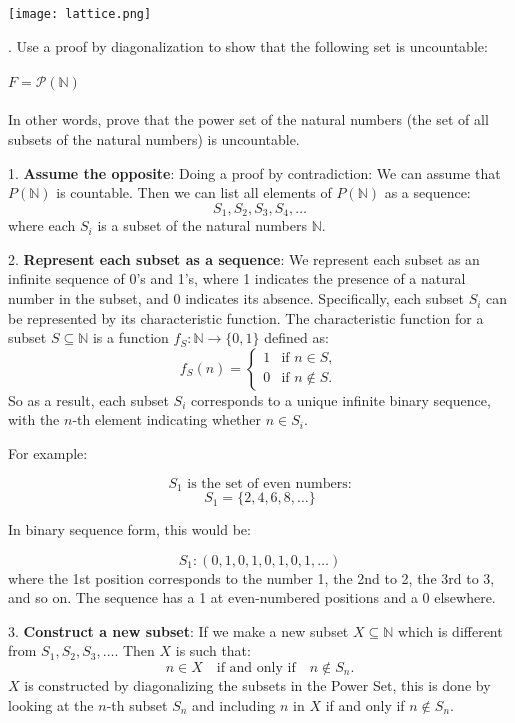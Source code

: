 \documentclass[12pt]{article}
\newcounter{quesnum}
\newcommand{\question}[2][??]{
\begin{list}{\labelitemi}{\leftmargin=2em}
\item [\arabic{quesnum}.] {} {#2}
\end{list}
\addtocounter{quesnum}{1}
}
\begin{document}
\texttt{[image: lattice.png]}

\vspace{12pt}

\question[3]{
Use a proof by diagonalization to show that the following set is uncountable:\\
\\
$F= \mathcal{P}(\mathbb{N}) $
\\
\\
In other words, prove that the power set of the natural numbers (the set of all subsets of the natural numbers) is uncountable.
}

1. \textbf{Assume the opposite}: Doing a proof by contradiction: We can assume that \( P(\mathbb{N}) \) is countable. Then we can list all elements of \( P(\mathbb{N}) \)  as a sequence:
   \[
   S_1, S_2, S_3, S_4, \dots
   \]
   where each \( S_i \) is a subset of the natural numbers \( \mathbb{N} \).\newline

2. \textbf{Represent each subset as a sequence}: We represent each subset as an infinite sequence of 0's and 1's, where 1 indicates the presence of a natural number in the subset, and 0 indicates its absence. Specifically, each subset \( S_i \) can be represented by its characteristic function. The characteristic function for a subset \( S \subseteq \mathbb{N} \) is a function \( f_S: \mathbb{N} \to \{0, 1\} \) defined as:
   \[
   f_S(n) =
   \begin{cases}
   1 & \text{if } n \in S, \\
   0 & \text{if } n \notin S.
   \end{cases}
   \]
   So as a result, each subset \( S_i \) corresponds to a unique infinite binary sequence, with the \( n \)-th element indicating whether \( n \in S_i \).\newline

   For example:

\[
S_1 \text{ is the set of even numbers:}
\]
\[
S_1 = \{ 2, 4, 6, 8, \dots \}
\]

In binary sequence form, this would be:

\[
S_1: (0, 1, 0, 1, 0, 1, 0, 1, \dots)
\]
where the 1st position corresponds to the number 1, the 2nd to 2, the 3rd to 3, and so on. The sequence has a 1 at even-numbered positions and a 0 elsewhere.\newline


3. \textbf{Construct a new subset}: If we make a new subset \( X \subseteq \mathbb{N} \) which is different from \( S_1, S_2, S_3, \dots \). Then \( X \) is such that:
   \[
   n \in X \quad \text{if and only if} \quad n \notin S_n.
   \]
    \( X \) is constructed by diagonalizing the subsets in the Power Set, this is done by looking at the \( n \)-th subset \( S_n \) and including \( n \) in \( X \) if and only if \( n \notin S_n \).\newline
\end{document}
